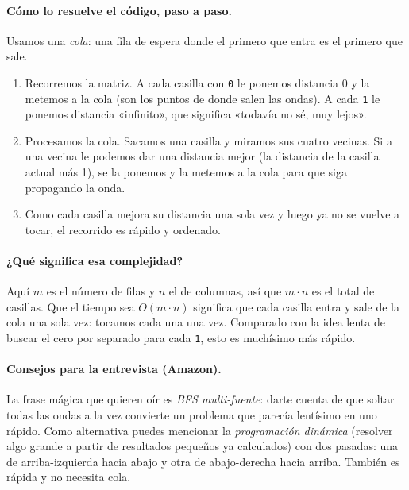 \paragraph{Cómo lo resuelve el código, paso a paso.} Usamos una \emph{cola}:
una fila de espera donde el primero que entra es el primero que sale.
\begin{enumerate}
  \item Recorremos la matriz. A cada casilla con \texttt{0} le ponemos
        distancia 0 y la metemos a la cola (son los puntos de donde salen las
        ondas). A cada \texttt{1} le ponemos distancia «infinito», que
        significa «todavía no sé, muy lejos».
  \item Procesamos la cola. Sacamos una casilla y miramos sus cuatro vecinas.
        Si a una vecina le podemos dar una distancia mejor (la distancia de la
        casilla actual más 1), se la ponemos y la metemos a la cola para que
        siga propagando la onda.
  \item Como cada casilla mejora su distancia una sola vez y luego ya no se
        vuelve a tocar, el recorrido es rápido y ordenado.
\end{enumerate}




\paragraph{¿Qué significa esa complejidad?} Aquí $m$ es el número de filas y
$n$ el de columnas, así que $m\cdot n$ es el total de casillas. Que el tiempo
sea $O(m\cdot n)$ significa que cada casilla entra y sale de la cola una sola
vez: tocamos cada una una vez. Comparado con la idea lenta de buscar el cero
por separado para cada \texttt{1}, esto es muchísimo más rápido.

\paragraph{Consejos para la entrevista (Amazon).} La frase mágica que quieren
oír es \emph{BFS multi-fuente}: darte cuenta de que soltar todas las ondas a la
vez convierte un problema que parecía lentísimo en uno rápido. Como alternativa
puedes mencionar la \emph{programación dinámica} (resolver algo grande a partir
de resultados pequeños ya calculados) con dos pasadas: una de arriba-izquierda
hacia abajo y otra de abajo-derecha hacia arriba. También es rápida y no
necesita cola.
